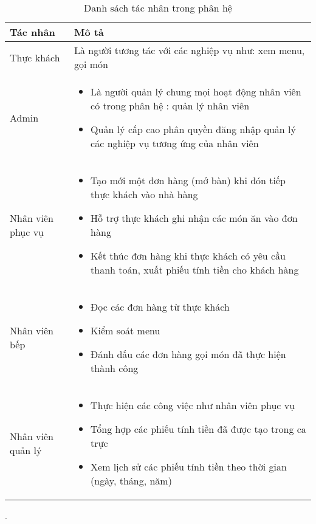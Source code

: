 \documentclass{report}
\begin{document}
\begin{table}[h]

\fontsize{11}{12}\selectfont
\begin{tabular}{|>{\centering\arraybackslash}m{8cm}|>{\centering\arraybackslash}m{8cm}|}
    \hline
    Tác nhân & Mô tả\\
    \hline
    Thực khách & Là người tương tác với các nghiệp vụ như: xem menu, gọi món \\
    \hline
    Admin & 
    \begin{itemize}
        \item Là người quản lý chung mọi hoạt động  nhân viên có trong phân hệ : quản lý nhân viên  
        \item Quản lý cấp cao phân quyền đăng nhập quản lý các nghiệp vụ tương ứng của nhân viên
    \end{itemize} \\
    \hline
    Nhân viên phục vụ & 
    \begin{itemize}
        \item Tạo mới một đơn hàng (mở bàn) khi đón tiếp thực khách vào nhà hàng
        \item Hỗ trợ thực khách ghi nhận các món ăn vào đơn hàng
        \item Kết thúc đơn hàng khi thực khách có yêu cầu thanh toán, xuất phiếu tính tiền cho khách hàng
    \end{itemize} \\
    \hline
    Nhân viên bếp & 
    \begin{itemize}
        \item Đọc các đơn hàng từ thực khách
        \item Kiểm soát menu
        \item Đánh dấu các đơn hàng gọi món đã thực hiện thành công
    \end{itemize} \\
    \hline
    Nhân viên quản lý & 
    \begin{itemize}
        \item Thực hiện các công việc như nhân viên phục vụ
        \item Tổng hợp các phiếu tính tiền đã được tạo trong ca trực
        \item Xem lịch sử các phiếu tính tiền theo thời gian (ngày, tháng, năm)
    \end{itemize} \\
    \hline
\end{tabular} 

    \caption{Danh sách tác nhân trong phân hệ}.

\end{table}
\FloatBarrier
\end{document}
